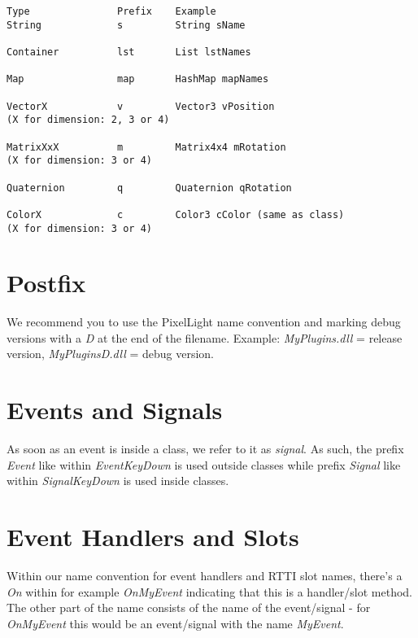 \begin{lstlisting}[caption=Variable prefixes for PixelLight types]
Type               Prefix    Example
String             s         String sName

Container          lst       List lstNames

Map                map       HashMap mapNames

VectorX            v         Vector3 vPosition
(X for dimension: 2, 3 or 4)

MatrixXxX          m         Matrix4x4 mRotation
(X for dimension: 3 or 4)

Quaternion         q         Quaternion qRotation

ColorX             c         Color3 cColor (same as class)
(X for dimension: 3 or 4)
\end{lstlisting}




\section{Postfix}
We recommend you to use the PixelLight name convention and marking debug versions with a \emph{D} at the end of the filename. Example: \emph{MyPlugins.dll} = release version, \emph{MyPluginsD.dll} = debug version.




\section{Events and Signals}
As soon as an event is inside a class, we refer to it as \emph{signal}. As such, the prefix \emph{Event} like within \emph{EventKeyDown} is used outside classes while prefix \emph{Signal} like within \emph{SignalKeyDown} is used inside classes.




\section{Event Handlers and Slots}
Within our name convention for event handlers and \ac{RTTI} slot names, there's a \emph{On} within for example \emph{OnMyEvent} indicating that this is a handler/slot method. The other part of the name consists of the name of the event/signal - for \emph{OnMyEvent} this would be an event/signal with the name \emph{MyEvent}.




